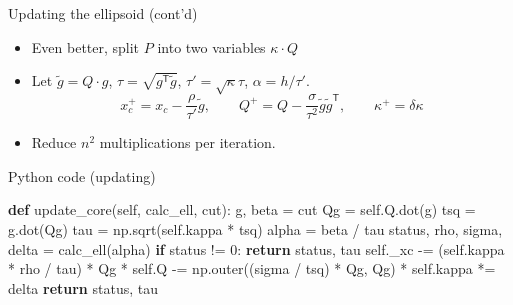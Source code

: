 \documentclass[10pt,ignorenonframetext,serif,onlymath]{beamer}
\newenvironment{Shaded}{}{}
\newcommand{\ControlFlowTok}[1]{\textcolor[rgb]{0.00,0.44,0.13}{\textbf{#1}}}
\newcommand{\DecValTok}[1]{\textcolor[rgb]{0.25,0.63,0.44}{#1}}
\newcommand{\KeywordTok}[1]{\textcolor[rgb]{0.00,0.44,0.13}{\textbf{#1}}}
\newcommand{\NormalTok}[1]{#1}
\newcommand{\OperatorTok}[1]{\textcolor[rgb]{0.40,0.40,0.40}{#1}}
\newcommand{\VariableTok}[1]{\textcolor[rgb]{0.10,0.09,0.49}{#1}}
\providecommand{\tightlist}{%
  \setlength{\itemsep}{0pt}\setlength{\parskip}{0pt}}
\begin{document}
\begin{frame}{Updating the ellipsoid (cont’d)}
\protect\hypertarget{sec:updating-the-ellipsoid-contd}{}

\begin{itemize}
\tightlist
\item
  Even better, split \(P\) into two variables \(\kappa \cdot Q\)
\item
  Let \(\tilde{g} = Q \cdot g\), \(\tau = \sqrt{g^\mathsf{T}\tilde{g}}\),
  \(\tau' = \sqrt{\kappa} \tau\), \(\alpha = h/\tau'\).
  \[x_c^+ = x_c - \frac{\rho}{\tau'} \tilde{g}, \qquad
  Q^+ = Q - \frac{\sigma}{\tau^2} \tilde{g}\tilde{g}^\mathsf{T}, \qquad
  \kappa^+ =  \delta \kappa
   \]
\item
  Reduce \(n^2\) multiplications per iteration.
\end{itemize}

\end{frame}

\begin{frame}[fragile]{Python code (updating)}
\protect\hypertarget{sec:python-code-updating}{}

\begin{Shaded}
\begin{Highlighting}[]
\KeywordTok{def}\NormalTok{ update_core(}\VariableTok{self}\NormalTok{, calc_ell, cut):}
\NormalTok{    g, beta }\OperatorTok{=}\NormalTok{ cut}
\NormalTok{    Qg }\OperatorTok{=} \VariableTok{self}\NormalTok{.Q.dot(g)}
\NormalTok{    tsq }\OperatorTok{=}\NormalTok{ g.dot(Qg)}
\NormalTok{    tau }\OperatorTok{=}\NormalTok{ np.sqrt(}\VariableTok{self}\NormalTok{.kappa }\OperatorTok{*}\NormalTok{ tsq)}
\NormalTok{    alpha }\OperatorTok{=}\NormalTok{ beta }\OperatorTok{/}\NormalTok{ tau}
\NormalTok{    status, rho, sigma, delta }\OperatorTok{=}\NormalTok{ calc_ell(alpha)}
    \ControlFlowTok{if}\NormalTok{ status }\OperatorTok{!=} \DecValTok{0}\NormalTok{:}
        \ControlFlowTok{return}\NormalTok{ status, tau}
    \VariableTok{self}\NormalTok{._xc }\OperatorTok{-=}\NormalTok{ (}\VariableTok{self}\NormalTok{.kappa }\OperatorTok{*}\NormalTok{ rho }\OperatorTok{/}\NormalTok{ tau) }\OperatorTok{*}\NormalTok{ Qg}
\OperatorTok{*}   \VariableTok{self}\NormalTok{.Q }\OperatorTok{-=}\NormalTok{ np.outer((sigma }\OperatorTok{/}\NormalTok{ tsq) }\OperatorTok{*}\NormalTok{ Qg, Qg)}
\OperatorTok{*}   \VariableTok{self}\NormalTok{.kappa }\OperatorTok{*=}\NormalTok{ delta}
    \ControlFlowTok{return}\NormalTok{ status, tau}
\end{Highlighting}
\end{Shaded}

\end{frame}
\end{document}
